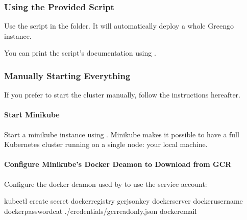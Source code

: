 \documentclass[letterpaper,10pt,english]{sphinxmanual}
\begin{document}
\subsubsection{Using the Provided Script}
\label{\detokenize{deployments:using-the-provided-script}}
Use the script  in the  folder.
It will automatically deploy a whole Greengo instance.

You can print the script’s documentation using .


\subsubsection{Manually Starting Everything}
\label{\detokenize{deployments:manually-starting-everything}}
If you prefer to start the cluster manually, follow the instructions hereafter.


\paragraph{Start Minikube}
\label{\detokenize{deployments:start-minikube}}
Start a minikube instance using .
Minikube makes it possible to have a full Kubernetes cluster running on a single node: your local machine.


\paragraph{Configure Minikube’s Docker Deamon to Download from GCR}
\label{\detokenize{deployments:configure-minikube-s-docker-deamon-to-download-from-gcr}}
Configure the docker deamon used by  to use the  service account:

\begin{sphinxVerbatim}[commandchars=\\\{\}]
kubectl create secret docker\PYGZhy{}registry gcr\PYGZhy{}json\PYGZhy{}key 
\PYGZhy{}\PYGZhy{}docker\PYGZhy{}server 
\PYGZhy{}\PYGZhy{}docker\PYGZhy{}username 
\PYGZhy{}\PYGZhy{}docker\PYGZhy{}passwordcat ./credentials/gcr\PYGZhy{}read\PYGZhy{}only.json 
\PYGZhy{}\PYGZhy{}docker\PYGZhy{}email
\end{sphinxVerbatim}
\end{document}
